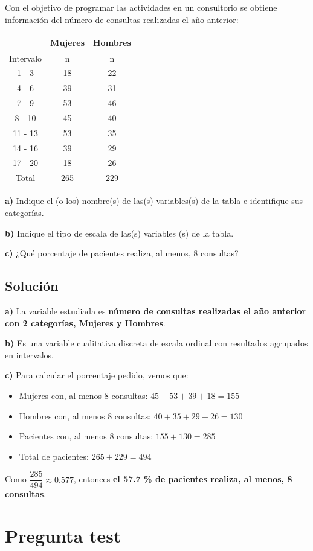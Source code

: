 \documentclass[
]{book}
\begin{document}
Con el objetivo de programar las actividades en un consultorio se obtiene información del número de consultas realizadas el año anterior:

\begin{longtable}[]{@{}ccc@{}}
\toprule
& Mujeres & Hombres\tabularnewline
\midrule
\endhead
Intervalo & n & n\tabularnewline
1 - 3 & 18 & 22\tabularnewline
4 - 6 & 39 & 31\tabularnewline
7 - 9 & 53 & 46\tabularnewline
8 - 10 & 45 & 40\tabularnewline
11 - 13 & 53 & 35\tabularnewline
14 - 16 & 39 & 29\tabularnewline
17 - 20 & 18 & 26\tabularnewline
Total & 265 & 229\tabularnewline
\bottomrule
\end{longtable}

\textbf{a)} Indique el (o los) nombre(s) de las(s) variables(s) de la tabla e identifique sus categorías.

\textbf{b)} Indique el tipo de escala de las(s) variables (s) de la tabla.

\textbf{c)} ¿Qué porcentaje de pacientes realiza, al menos, 8 consultas?

\hypertarget{soluciuxf3n-2}{%
\subsection{Solución}\label{soluciuxf3n-2}}

\textbf{a)} La variable estudiada es \textbf{número de consultas realizadas el año anterior con 2 categorías, Mujeres y Hombres}.

\textbf{b)} Es una variable cualitativa discreta de escala ordinal con resultados agrupados en intervalos.

\textbf{c)} Para calcular el porcentaje pedido, vemos que:

\begin{itemize}
\item
  Mujeres con, al menos 8 consultas: \(45 + 53 + 39 + 18 = 155\)
\item
  Hombres con, al menos 8 consultas: \(40 + 35 + 29 + 26 = 130\)
\item
  Pacientes con, al menos 8 consultas: \(155 + 130 = 285\)
\item
  Total de pacientes: \(265 + 229 = 494\)
\end{itemize}

Como \(\dfrac{285}{494} \approx 0.577\), entonces \textbf{el 57.7 \% de pacientes realiza, al menos, 8 consultas}.

\hypertarget{pregunta-test-17}{%
\section{Pregunta test}\label{pregunta-test-17}}
\end{document}
